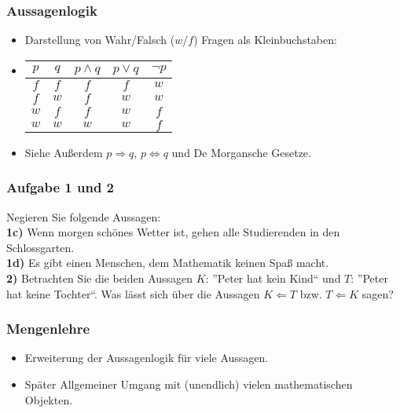 \documentclass{beamer}
\begin{document}
\begin{frame}
    \frametitle{Aussagenlogik}
    \begin{itemize}
        \item Darstellung von Wahr/Falsch ($w$/$f$) Fragen als Kleinbuchstaben:
        \item 
            \begin{center}
                \begin{tabular}{c c | c | c | c}
                    $p$ & $q$ & $p \wedge q$ & $p \vee q$ & $\neg p$ \\
                    \hline
                    $f$ & $f$ & $f$ & $f$ & $w$  \\
                    $f$ & $w$ & $f$ & $w$ & $w$  \\
                    $w$ & $f$ & $f$ & $w$ & $f$  \\
                    $w$ & $w$ & $w$ & $w$ & $f$  \\
                \end{tabular}
            \end{center}
        \item Siehe Außerdem $p \Rightarrow q$, $p \Leftrightarrow q$ und De Morgansche Gesetze.
    \end{itemize}
\end{frame}

\begin{frame}
    \frametitle{Aufgabe 1 und 2}
    Negieren Sie folgende Aussagen:\\
    \textbf{1c)} Wenn morgen schönes Wetter ist, gehen alle Studierenden in den Schlossgarten.\\
    \textbf{1d)} Es gibt einen Menschen, dem Mathematik keinen Spaß macht.\\
    \vspace{1cm}
    \textbf{2)} Betrachten Sie die beiden Aussagen $K$: ”Peter hat kein Kind“ und $T$: ”Peter hat keine Tochter“. Was lässt sich über die Aussagen $K \Leftarrow T$ bzw. $T \Leftarrow K$ sagen?
\end{frame}

\begin{frame}
    \frametitle{Mengenlehre}
    \begin{itemize}
        \item Erweiterung der Aussagenlogik für viele Aussagen.
        \item Später Allgemeiner Umgang mit (unendlich) vielen mathematischen Objekten.
    \end{itemize}
    \begin{figure}
    	\centering
    	\def\svgwidth{\columnwidth}
        
    	\label{fig:kkk}
    \end{figure}
\end{frame}
\end{document}
